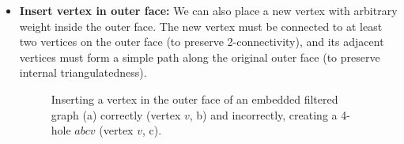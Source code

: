 \begin{itemize}
	\item \textbf{Insert vertex in outer face:} We can also place a new vertex with arbitrary weight inside the outer face. The new vertex must be connected to at least two vertices on the outer face (to preserve 2-connectivity), and its adjacent vertices must form a simple path along the original outer face (to preserve internal triangulatedness).
\begin{figure}[H]
	\centering
	\quad
	\quad
	\caption{Inserting a vertex in the outer face of an embedded filtered graph (a) correctly (vertex $v$, b) and incorrectly, creating a 4-hole $abcv$ (vertex $v$, c).}
	\label{fig:transformation}
\end{figure}


\end{itemize}
